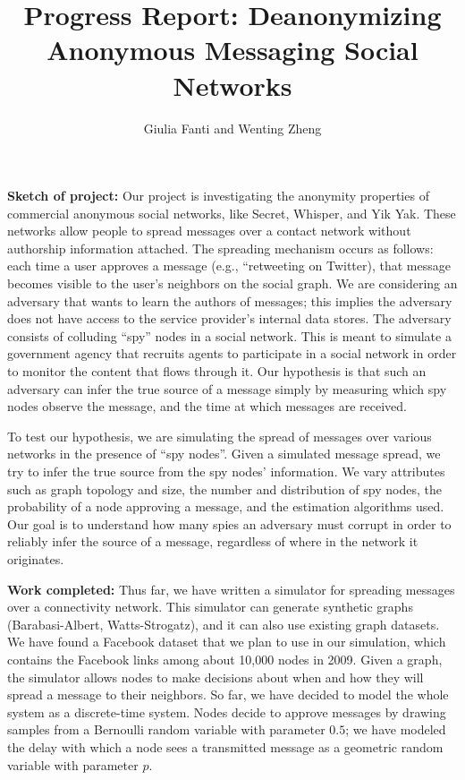 \documentclass[11pt, onecolumn]{article}
\begin{document}
\title{Progress Report: Deanonymizing Anonymous Messaging Social Networks}

\author{Giulia Fanti and Wenting Zheng}

   \date{}
   \maketitle
   \thispagestyle{empty}
\textbf{Sketch of project:} Our project is investigating the anonymity properties of commercial anonymous social networks, like Secret, Whisper, and Yik Yak. These networks allow people to spread messages over a contact network without authorship information attached. The spreading mechanism occurs as follows: each time a user approves a message (e.g., “retweeting  on Twitter), that message becomes visible to the user's neighbors on the social graph. We are considering an adversary that wants to learn the authors of messages; this implies the adversary does not have access to the service provider's internal data stores. The adversary consists of colluding “spy” nodes in a social network. This is meant to simulate a government agency that recruits agents to participate in a social network in order to monitor the content that flows through it. Our hypothesis is that such an adversary can infer the true source of a message simply by measuring which spy nodes observe the message, and the time at which messages are received. 

To test our hypothesis, we are simulating the spread of messages over various networks in the presence of “spy nodes”. Given a simulated message spread, we try to infer the true source from the spy nodes’ information.  We vary attributes such as graph topology and size, the number and distribution of spy nodes, the probability of a node approving a message, and the estimation algorithms used. Our goal is to understand how many spies an adversary must corrupt in order to reliably infer the source of a message, regardless of where in the network it originates.

\vspace{0.1in}
\textbf{Work completed:} Thus far, we have written a simulator for spreading messages over a connectivity network. This simulator can generate synthetic graphs (Barabasi-Albert, Watts-Strogatz), and it can also use existing graph datasets. We have found a Facebook dataset that we plan to use in our simulation, which contains the Facebook links among about 10,000 nodes in 2009. Given a graph, the simulator allows nodes to make decisions about when and how they will spread a message to their neighbors. So far, we have decided to model the whole system as a discrete-time system. Nodes decide to approve messages by drawing samples from a Bernoulli random variable with parameter $0.5$; we have modeled the delay with which a node sees a transmitted message as a geometric random variable with parameter $p$. 
\end{document}
